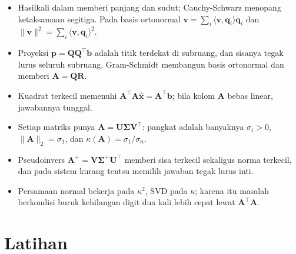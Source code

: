 \begin{ringkasan}
\begin{itemize}
  \item Hasilkali dalam memberi panjang dan sudut; Cauchy-Schwarz menopang ketaksamaan
        segitiga. Pada basis ortonormal
        $\mathbf{v}=\sum_{i}\langle\mathbf{v},\mathbf{q}_{i}\rangle\mathbf{q}_{i}$ dan
        $\|\mathbf{v}\|^{2}=\sum_{i}\langle\mathbf{v},\mathbf{q}_{i}\rangle^{2}$.
  \item Proyeksi $\mathbf{p}=\mathbf{Q}\mathbf{Q}^{\top}\mathbf{b}$ adalah titik terdekat
        di subruang, dan sisanya tegak lurus seluruh subruang. Gram-Schmidt membangun
        basis ortonormal dan memberi $\mathbf{A}=\mathbf{Q}\mathbf{R}$.
  \item Kuadrat terkecil memenuhi $\mathbf{A}^{\top}\mathbf{A}\hat{\mathbf{x}}
        =\mathbf{A}^{\top}\mathbf{b}$; bila kolom $\mathbf{A}$ bebas linear, jawabannya tunggal.
  \item Setiap matriks punya $\mathbf{A}=\mathbf{U}\boldsymbol{\Sigma}\mathbf{V}^{\top}$:
        pangkat adalah banyaknya $\sigma_{i}>0$, $\|\mathbf{A}\|_{2}=\sigma_{1}$, dan
        $\kappa(\mathbf{A})=\sigma_{1}/\sigma_{n}$.
  \item Pseudoinvers $\mathbf{A}^{+}=\mathbf{V}\boldsymbol{\Sigma}^{+}\mathbf{U}^{\top}$
        memberi sisa terkecil sekaligus norma terkecil, dan pada sistem kurang tentsu
        memilih jawaban tegak lurus inti.
  \item Persamaan normal bekerja pada $\kappa^{2}$, SVD pada $\kappa$; karena itu masalah
        berkondisi buruk kehilangan digit dua kali lebih cepat lewat $\mathbf{A}^{\top}\mathbf{A}$.
\end{itemize}
\end{ringkasan}

\section{Latihan}

